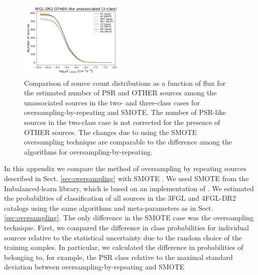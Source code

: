 \documentclass[referee]{aa} %
\begin{document}
\begin{appendix}
\begin{figure}[h]
\includegraphics[width=0.45\textwidth]{plots/oversample/N_logS_4FGL-DR2_OTHER_3classes_O_vs_S.pdf}
\caption{Comparison of source count distributions as a function of flux for the estimated number of PSR and OTHER sources
among the unassociated sources in the two- and three-class cases for oversampling-by-repeating and SMOTE.
The number of PSR-like sources in the two-class case is not corrected for the presence of OTHER sources.
The changes due to using the SMOTE oversampling technique are comparable to the difference among the algorithms
for oversampling-by-repeating.
}
\label{fig:S_vs_O_NlogS}
\end{figure}

In this appendix we compare the method of oversampling by repeating sources described in Sect. \ref{sec:oversampling} 
with SMOTE \citep{Chawla_2002}. We used SMOTE from the Imbalanced-learn library, which is based on an implementation of \citet{Chawla_2002}. 
We estimated the probabilities of classification of all sources in the 3FGL and 4FGL-DR2 catalogs using the same algorithms and meta-parameters as in Sect. \ref{sec:oversampling}.
The only difference in the SMOTE case was the oversampling technique.
First, we compared the difference in class probabilities for individual sources relative to the statistical uncertainty due to the random choice of the training samples.
In particular, we calculated the difference in probabilities of belonging to, for example, the PSR class relative to the maximal standard deviation
between oversampling-by-repeating and SMOTE


\end{appendix}
\end{document}
